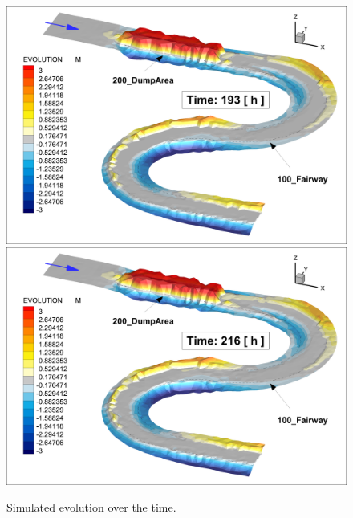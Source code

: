 \begin{figure} [!h]
	\centering
	\includegraphics[scale=0.14]{../img/critDig_Poly_193h.png}
	\includegraphics[scale=0.14]{../img/critDig_Poly_216h.png}
	\caption{Simulated evolution over the time.}\label{result78}
\end{figure}






